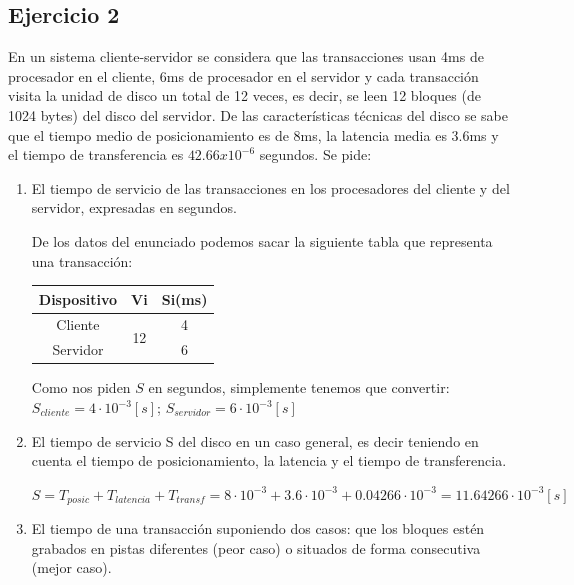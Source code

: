 \subsection{Ejercicio 2}
En un sistema cliente-servidor se considera que las transacciones usan 4ms de procesador en el cliente, 6ms de procesador en el servidor y cada transacción visita la unidad de disco un total de 12 veces, es decir, se leen 12 bloques (de 1024 bytes) del disco del servidor. De las características técnicas del disco se sabe que el tiempo medio de posicionamiento es de 8ms, la latencia media es 3.6ms y el tiempo de transferencia es  $42.66 x 10^{-6}$ segundos. Se pide:
\begin{enumerate}
    \item El tiempo de servicio de las transacciones en los procesadores del cliente y del servidor, expresadas en segundos.
    \begin{tcolorbox}[colback=white,colframe=cyan!50!black,fonttitle=\bfseries]
    De los datos del enunciado podemos sacar la siguiente tabla que representa una transacción:
    \begin{table}[H]\centering\begin{tabular}{|c|c|c|}\hline
    \textbf{Dispositivo}    & \textbf{Vi} & \textbf{Si(ms)} \\ \hline
    Cliente & \multirow{2}{*}{12}& 4  \\ \cline{1-1} \cline{3-3}
    Servidor && 6   \\ \hline
    \end{tabular}\end{table}
    Como nos piden $S$ en segundos, simplemente tenemos que convertir:\\
    $S_{cliente}=4\cdot10^{-3}[s]$;  $S_{servidor}=6\cdot10^{-3}[s]$
    \end{tcolorbox}
    \item El tiempo de servicio S del disco en un caso general, es decir teniendo en cuenta el tiempo de posicionamiento, la latencia y el tiempo de transferencia.
    \begin{tcolorbox}[colback=white,colframe=cyan!50!black,fonttitle=\bfseries]
$S =T_{posic}+T_{latencia}+T_{transf}=8\cdot10^{-3}+3.6\cdot10^{-3}+0.04266\cdot10^{-3}=11.64266\cdot10^{-3}[s]$
    \end{tcolorbox}
    \item El tiempo de una transacción suponiendo dos casos: que los bloques estén grabados en pistas diferentes (peor caso) o situados de forma consecutiva (mejor caso).
    \begin{tcolorbox}[colback=white,colframe=cyan!50!black,fonttitle=\bfseries]

\end{tcolorbox}
\end{enumerate}
